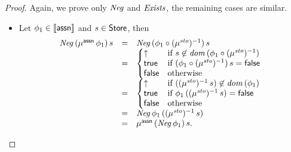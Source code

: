 \documentclass[12pt,a4paper]{report}
\newcommand{\ssto}{\nstyle{sto}}
\newcommand{\Neg}{\nstyle{Neg}}
\newcommand{\Exists}{\nstyle{Exists}}
\begin{document}
\begin{proof}
  Again, we prove only $\Neg$ and $\Exists$, the remaining cases are similar.
  \begin{itemize}
    \item Let $\phi_1 \in \llbracket\mathsf{assn}\rrbracket$ and $s \in \mathsf{Store}$, then
          \[\begin{array}{rcl}
            \Neg\,(\mu^\tassn\,\phi_1)\,s 
            &=& \Neg\,(\phi_1\circ(\mu^\ssto)^{-1})\,s \\
            &=& \bcase
                  \uparrow  & \text{if } s \not\in \dom{\phi_1 \circ (\mu^\ssto)^{-1}} \\
                  \true     & \text{if } (\phi_1 \circ (\mu^\ssto)^{-1})\,s=\false \\
                  \false    & \text{otherwise}
                \ecase \\
            &=& \bcase
                  \uparrow  & \text{if } ((\mu^\ssto)^{-1}\,s) \not\in \dom{\phi_1} \\
                  \true     & \text{if } \phi_1\,((\mu^\ssto)^{-1}\,s) = \false \\
                  \false    & \text{otherwise}
                \ecase \\
            &=& \Neg\,\phi_1\,((\mu^\ssto)^{-1}\,s) \\
            &=& \mu^\tassn\,(\Neg\,\phi_1)\,s.
          \end{array}\]


\end{itemize}
\end{proof}
\end{document}
